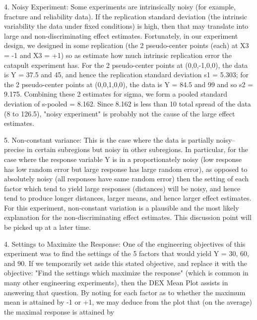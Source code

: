       4. Noisy Experiment: Some experiments are
         intrinsically noisy (for example, fracture and
         reliability data).  If the replication standard
         deviation (the intrinsic variability the data
         under fixed conditions) is high, then that
         may translate into large and non-discriminating
         effect estimates.  Fortunately, in our
         experiment design, we designed in some
         replication (the 2 pseudo-center points (each) at
         X3 = -1 and X3 = +1) so as estimate how much
         intrinsic replication error the catapult experiment
         has.  For the 2 pseudo-center points at
         (0,0,-1,0,0), the data is Y = 37.5 and 45, and
         hence the replication standard deviation s1 =
         5.303; for the 2 pseudo-center points at
         (0,0,1,0,0), the data is Y = 84.5 and 99 and so
         s2 = 9.175.  Combining these 2 estimates for sigma,
         we form a pooled standard deviation of s-pooled
         = 8.162.  Since 8.162 is less than 10%
         total spread of the data (8 to 126.5), "noisy
         experiment" is probably not the cause of the large
         effect estimates.

      5. Non-constant variance: This is the case where
         the data is partially noisy-- precise in
         certain subregions but noisy in other
         subregions.  In particular, for the case
         where the response variable Y is in a
         proportionately noisy (low response has
         low random error but large response has
         large random error), as opposed to absolutely
         noisy (all responses have same random error)
         then the setting of each factor which tend to
         yield large responses (distances) will be
         noisy, and hence tend to produce longer
         distances, larger means, and hence larger
         effect estimates.  For this experiment,
         non-constant variation is a plausible and
         the most likely explanation for the
         non-discriminating effect estimates.
         This discussion point will be picked up
         at a later time.

4. Settings to Maximize the Response: One of the
   engineering objectives of this experiment was
   to find the settings of the 5 factors that
   would yield Y = 30, 60, and 90.  If we
   temporarily set aside this stated objective,
   and replace it with the objective: "Find the
   settings which maximize the response" (which is
   common in many other engineering experiments),
   then the DEX Mean Plot assists in answering
   that question.  By noting for each factor as to
   whether the maximum mean is attained by -1 or
   +1, we may deduce from the plot that (on the
   average) the maximal response is attained by

